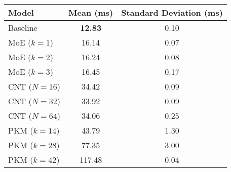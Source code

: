 \begin{tabular}{lcc}
\toprule
Model & Mean (ms) & Standard Deviation (ms) \\
\midrule
Baseline & \textbf{12.83} & 0.10 \\
MoE ($k=1$) & 16.14 & 0.07 \\
MoE ($k=2$) & 16.24 & 0.08 \\
MoE ($k=3$) & 16.45 & 0.17 \\
CNT ($N=16$) & 34.42 & 0.09 \\
CNT ($N=32$) & 33.92 & 0.09 \\
CNT ($N=64$) & 34.06 & 0.25 \\
PKM ($k=14$) & 43.79 & 1.30 \\
PKM ($k=28$) & 77.35 & 3.00 \\
PKM ($k=42$) & 117.48 & 0.04 \\
\bottomrule
\end{tabular}